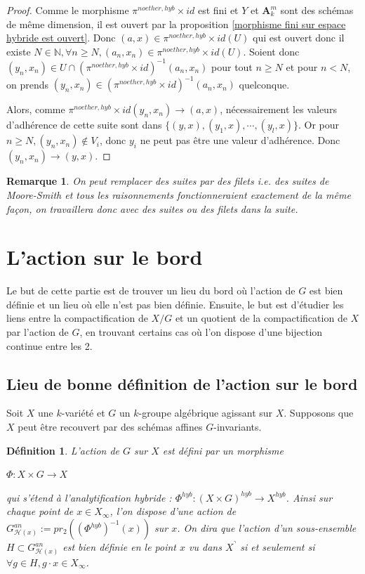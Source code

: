 \documentclass[11pt]{article}
\newcommand{\N}{\mathbb{N}}
\newcommand{\ana}{\mathbf{A}}
\newtheorem{defi}[thm]{Définition}
\newtheorem{rem}[thm]{Remarque}
\begin{document}
\begin{proof}
Comme le morphisme $\pi^{noether,hyb}\times id$ est fini et $Y$ et $\ana^m_k$ sont des schémas de même dimension, il est ouvert par la proposition \ref{morphisme fini sur espace hybride est ouvert}. Donc $(a,x) \in \pi^{noether,hyb}\times id(U)$ qui est ouvert donc il existe $N \in \N, \forall n \geq N, (a_n, x_n)\in \pi^{noether,hyb}\times id(U)$. Soient donc $(y_n, x_n) \in U \cap (\pi^{noether,hyb}\times id)^{-1}(a_n, x_n)$ pour tout $n \geq N$ et pour $n<N$, on prends $(y_n, x_n) \in (\pi^{noether,hyb}\times id)^{-1}(a_n, x_n)$ quelconque. 

Alors, comme $\pi^{noether,hyb}\times id (y_n,x_n) \rightarrow (a,x)$, nécessairement les valeurs d'adhérence de cette suite sont dans $ \lbrace (y,x), (y_1,x), \cdots, (y_l,x)\rbrace$. Or pour $n \geq N, (y_n, x_n) \notin V_i$, donc $y_i$ ne peut pas être une valeur d'adhérence. Donc $(y_n, x_n) \rightarrow (y,x)$.
\end{proof}

\begin{rem}
On peut remplacer des suites par des filets i.e. des suites de Moore-Smith et tous les raisonnements fonctionneraient exactement de la même façon, on travaillera donc avec des suites ou des filets dans la suite. 
\end{rem}

\section{L'action sur le bord}\label{SectionResultatActionBord}

Le but de cette partie est de trouver un lieu du bord où l'action de $G$ est bien définie et un lieu où elle n'est pas bien définie. Ensuite, le but est d'étudier les liens entre la compactification de $X/G$ et un quotient de la compactification de $X$ par l'action de $G$, en trouvant certains cas où l'on dispose d'une bijection continue entre les 2.

\subsection{Lieu de bonne définition de l'action sur le bord}

Soit $X$ une $k$-variété et $G$ un $k$-groupe algébrique agissant sur $X$. Supposons que $X$ peut être recouvert par des schémas affines $G$-invariants.
 
\begin{defi} 
L'action de $G$ sur $X$ est défini par un morphisme 
\begin{center}
$ \Phi : X \times G \rightarrow X$ 
\end{center} 
qui s'étend à l'analytification hybride : $\Phi^{hyb} : (X \times G)^{hyb} \rightarrow X^{hyb}$. Ainsi sur chaque point de $x \in X_\infty$, l'on dispose d'une action de $G^{an}_{\mathcal{H}(x)}:= pr_2((\Phi^{hyb})^{-1}(x))$ sur $x$. On dira que l'action d'un sous-ensemble $H \subset G^{an}_{\mathcal{H}(x)} $ est bien définie en le point $x$ vu dans $X^\urcorner$ si et seulement si $\forall g\in H, g\cdot x \in X_\infty$. 
\end{defi}
 
\end{document}
